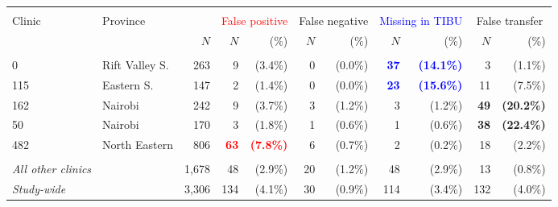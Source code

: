 \footnotesize{
\begin{tabular}{ll r|rr|rr|rr|rr}
\hline\hline \\[-8pt]
Clinic & Province & & \multicolumn{2}{c|}{\textcolor{red}{False positive}} & \multicolumn{2}{c|}{\textcolor{green!60!black}{False negative}} & \multicolumn{2}{c|}{\textcolor{blue}{Missing in TIBU}} & \multicolumn{2}{c}{\textcolor{orange!85!black}{False transfer}} \\
 & & $N$ & $N$ & (\%) & $N$ & (\%) & $N$ & (\%) & $N$ & (\%) \\
\hline \\[-8pt]
0 & Rift Valley S. & 263 & 9 & (3.4\%) & 0 & (0.0\%) & \textbf{\textcolor{blue}{37}} & \textbf{\textcolor{blue}{(14.1\%)}} & 3 & (1.1\%) \\
115 & Eastern S. & 147 & 2 & (1.4\%) & 0 & (0.0\%) & \textbf{\textcolor{blue}{23}} & \textbf{\textcolor{blue}{(15.6\%)}} & 11 & (7.5\%) \\
162 & Nairobi & 242 & 9 & (3.7\%) & 3 & (1.2\%) & 3 & (1.2\%) & \textbf{\textcolor{orange!85!black}{49}} & \textbf{\textcolor{orange!85!black}{(20.2\%)}} \\
50 & Nairobi & 170 & 3 & (1.8\%) & 1 & (0.6\%) & 1 & (0.6\%) & \textbf{\textcolor{orange!85!black}{38}} & \textbf{\textcolor{orange!85!black}{(22.4\%)}} \\
482 & North Eastern & 806 & \textbf{\textcolor{red}{63}} & \textbf{\textcolor{red}{(7.8\%)}} & 6 & (0.7\%) & 2 & (0.2\%) & 18 & (2.2\%) \\
\hline \\[-8pt]
\textit{All other clinics} & & 1,678 & 48 & (2.9\%) & 20 & (1.2\%) & 48 & (2.9\%) & 13 & (0.8\%) \\
\textit{Study-wide} & & 3,306 & 134 & (4.1\%) & 30 & (0.9\%) & 114 & (3.4\%) & 132 & (4.0\%) \\
\hline\hline
\end{tabular}}